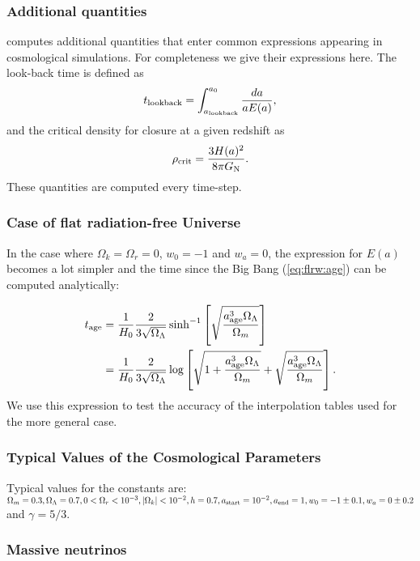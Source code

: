 \subsubsection{Additional quantities}

\swift computes additional quantities that enter common expressions appearing in
cosmological simulations. For completeness we give their expressions here. The
look-back time is defined as
\begin{equation}
  t_{\rm lookback} = \int_{a_{\rm lookback}}^{a_0} \frac{da}{a E(a)},
\end{equation}
and the critical density for closure at a given redshift as
\begin{equation}
  \rho_{\rm crit} = \frac{3H(a)^2}{8\pi G_{\rm{N}}}.
\end{equation}
These quantities are computed every time-step.

\subsubsection{Case of flat radiation-free Universe}

In the case where $\Omega_k = \Omega_r = 0$, $w_0=-1$ and $w_a = 0$, the
expression for $E(a)$ becomes a lot simpler and the time since the Big
Bang (\ref{eq:flrw:age}) can be computed analytically:

\begin{align}
  t_{\rm age} &= \frac{1}{H_0}\frac{2}{3\sqrt{\Omega_\Lambda}} \sinh^{-1}\left[\sqrt{\frac{a_{\rm age}^3 \Omega_\Lambda}{\Omega_m}}\right] \\
              &= \frac{1}{H_0}\frac{2}{3\sqrt{\Omega_\Lambda}}
\log\left[\sqrt{1+\frac{a_{\rm age}^3 \Omega_\Lambda}{\Omega_m}} + \sqrt{\frac{a_{\rm age}^3 \Omega_\Lambda}{\Omega_m}}\right].
\end{align}
We use this expression to test the accuracy of the interpolation
tables used for the more general case.

\subsubsection{Typical Values of the Cosmological Parameters}

Typical values for the constants are: $\Omega_m = 0.3, \Omega_\Lambda=0.7, 0 <
\Omega_r<10^{-3}, |\Omega_k | < 10^{-2}, h=0.7, a_{\rm start} = 10^{-2}, a_{\rm
end} = 1, w_0 = -1\pm 0.1, w_a=0\pm0.2$ and $\gamma = 5/3$.

\subsubsection{Massive neutrinos}

